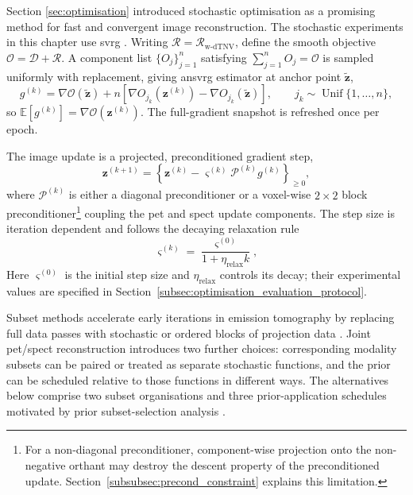 Section \ref{sec:optimisation} introduced stochastic optimisation as a promising method for fast and convergent image reconstruction. The stochastic experiments in this chapter use \gls{svrg} \cite{johnsonAcceleratingStochasticGradient2013,twyman_investigation_2023,ehrhardtFastPETReconstruction2025a}. Writing $\mathcal R=\mathcal{R}_{\mathrm{w\text{-}dTNV}}$, define the smooth objective $\mathcal{O}=\mathcal D+\mathcal R$. A component list $\{O_j\}_{j=1}^{n}$ satisfying $\sum_{j=1}^{n}O_j=\mathcal{O}$ is sampled uniformly with replacement, giving an\gls{svrg} estimator at anchor point $\widetilde{\bm z}$,
\[
    g^{(k)}
    =
    \nabla\mathcal{O}(\widetilde{\bm z})
    +n\!\left[
        \nabla O_{j_k}(\bm z^{(k)})
        -\nabla O_{j_k}(\widetilde{\bm z})
    \right],
    \qquad j_k\sim\operatorname{Unif}\{1,\ldots,n\},
\]
so $\mathbb E[g^{(k)}]=\nabla\mathcal{O}(\bm z^{(k)})$. The full-gradient snapshot is refreshed once per epoch.

The image update is a projected, preconditioned gradient step,
\begin{equation}
    \bm z^{(k+1)}
    =
    \left\{
    \bm z^{(k)}
    -
    \varsigma^{(k)} \mathcal{P}^{(k)} g^{(k)}
    \right\}_{\geq 0},
    \label{eq:optimisation_projected_update}
\end{equation}
where $\mathcal{P}^{(k)}$ is either a diagonal preconditioner or a voxel-wise $2\times2$ block preconditioner\footnote{For a non-diagonal preconditioner, component-wise projection onto the non-negative orthant may destroy the descent property of the preconditioned update. Section~\ref{subsubsec:precond_constraint} explains this limitation.} coupling the \gls{pet} and \gls{spect} update components. The step size is iteration dependent and follows the decaying relaxation rule
\begin{equation}
    \varsigma^{(k)}
    =
    \frac{\varsigma^{(0)}}{1+\eta_{\mathrm{relax}} k},
    \label{eq:optimisation_step_size}
\end{equation}
Here $\varsigma^{(0)}$ is the initial step size and $\eta_{\mathrm{relax}}$ controls its decay; their experimental values are specified in Section~\ref{subsec:optimisation_evaluation_protocol}.

Subset methods accelerate early iterations in emission tomography by replacing full data passes with stochastic or ordered blocks of projection data \cite{hudsonAcceleratedImageReconstruction1994}. Joint \gls{pet}/\gls{spect} reconstruction introduces two further choices: corresponding modality subsets can be paired or treated as separate stochastic functions, and the prior can be scheduled relative to those functions in different ways. The alternatives below comprise two subset organisations and three prior-application schedules motivated by prior subset-selection analysis \cite{porterOptimisingSubsetSelection2024a}.

